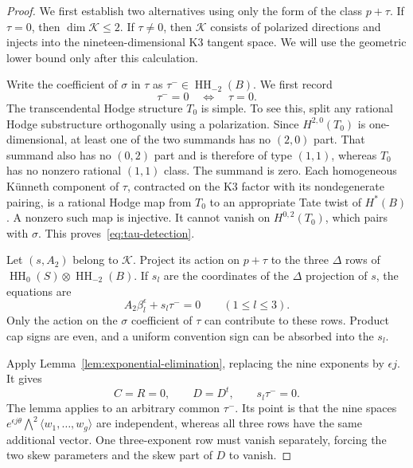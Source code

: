 \documentclass[11pt]{article}
\numberwithin{equation}{section}
\theoremstyle{definition}
\theoremstyle{remark}
\newcommand{\HH}{\operatorname{HH}}
\begin{document}
\begin{proof}
We first establish two alternatives using only the form of the
class $p+\tau$. If $\tau=0$, then $\dim\mathcal K\le2$.
If $\tau\ne0$, then $\mathcal K$ consists of polarized directions
and injects into the nineteen-dimensional K3 tangent space.
We will use the geometric lower bound only after this calculation.

Write the coefficient of $\sigma$ in $\tau$ as
$\tau^-\in\HH_{-2}(B)$. We first record
\begin{equation}\label{eq:tau-detection}
 \tau^-=0\quad\Longleftrightarrow\quad\tau=0.
\end{equation}
The transcendental Hodge structure $T_0$ is simple. To see this,
split any rational Hodge substructure orthogonally using a
polarization. Since $H^{2,0}(T_0)$ is one-dimensional, at least one
of the two summands has no $(2,0)$ part. That summand also has no
$(0,2)$ part and is therefore of type $(1,1)$, whereas $T_0$ has no
nonzero rational $(1,1)$ class. The summand is zero.
Each homogeneous K\"unneth component of $\tau$, contracted on the
K3 factor with its nondegenerate pairing, is a rational Hodge map
from $T_0$ to an appropriate Tate twist of $H^*(B)$. A nonzero such
map is injective. It cannot vanish on $H^{0,2}(T_0)$, which pairs
with $\sigma$. This proves~\eqref{eq:tau-detection}.

Let $(s,A_2)$ belong to $\mathcal K$. Project its action on $p+\tau$ to the
three $\Delta$ rows of
$\HH_0(S)\otimes\HH_{-2}(B)$. If $s_l$ are the coordinates of the
$\Delta$ projection of $s$, the equations are
\begin{equation}\label{eq:Delta-kernel-equations}
 A_2\beta_l^\epsilon+s_l\tau^-=0\qquad(1\le l\le3).
\end{equation}
Only the action on the $\sigma$ coefficient of $\tau$ can contribute
to these rows. Product cap signs are even, and a uniform convention
sign can be absorbed into the $s_l$.

Apply Lemma~\ref{lem:exponential-elimination}, replacing the nine
exponents by $\epsilon j$. It gives
\begin{equation}\label{eq:skew-vanishing}
 C=R=0,\qquad D=D^t,\qquad s_l\tau^-=0.
\end{equation}
The lemma applies to an arbitrary common $\tau^-$. Its point is that
the nine spaces
$e^{\epsilon j\theta}\bigwedge^2\langle w_1,\ldots,w_g\rangle$
are independent, whereas all three rows have the same additional
vector. One three-exponent row must vanish separately, forcing
the two skew parameters and the skew part of $D$ to vanish.


\end{proof}
\end{document}
